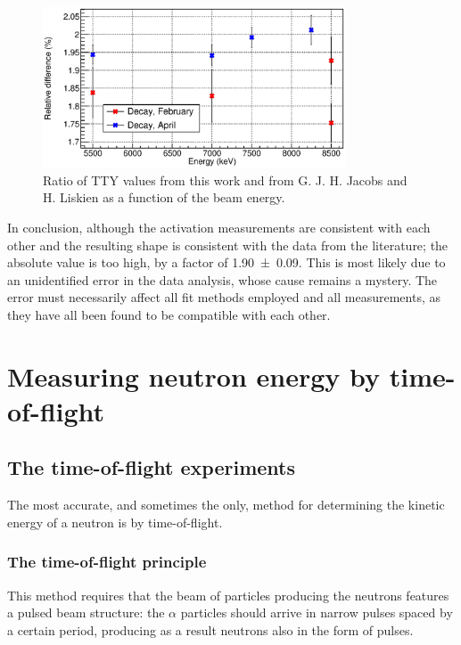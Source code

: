 \documentclass[a4paper,12pt]{report}
\begin{document}
\begin{figure}[H]
	\centering
	\includegraphics[width=0.80\textwidth]{activation_result_diffs.eps}	%
	\caption{Ratio of TTY values from this work and from G. J. H. Jacobs and H. Liskien \cite{jacobs} as a function of the beam energy.}	%
	\label{activation_result_diffs}
\end{figure}

In conclusion, although the activation measurements are consistent with each other and the resulting shape is consistent with the data from the literature; the absolute value is too high, by a factor of \num{1.90(9)}.
This is most likely due to an unidentified error in the data analysis, whose cause remains a mystery.
The error must necessarily affect all fit methods employed and all measurements, as they have all been found to be compatible with each other.



\chapter{Measuring neutron energy by time-of-flight}

\section{The time-of-flight experiments}
The most accurate, and sometimes the only, method for determining the kinetic energy of a neutron is by time-of-flight.

\subsection{The time-of-flight principle} 
This method requires that the beam of particles producing the neutrons features a pulsed beam structure: the $\alpha$ particles should arrive in narrow pulses spaced by a certain period, producing as a result neutrons also in the form of pulses.
\\
\end{document}
